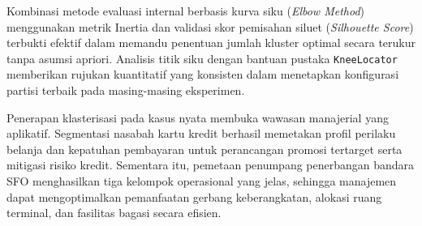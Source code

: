 \documentclass[a4paper,oneside,12pt]{report}
\begin{document}
Kombinasi metode evaluasi internal berbasis kurva siku (\textit{Elbow Method}) menggunakan metrik Inertia dan validasi skor pemisahan siluet (\textit{Silhouette Score}) terbukti efektif dalam memandu penentuan jumlah kluster optimal secara terukur tanpa asumsi apriori. Analisis titik siku dengan bantuan pustaka \texttt{KneeLocator} memberikan rujukan kuantitatif yang konsisten dalam menetapkan konfigurasi partisi terbaik pada masing-masing eksperimen.

Penerapan klasterisasi pada kasus nyata membuka wawasan manajerial yang aplikatif. Segmentasi nasabah kartu kredit berhasil memetakan profil perilaku belanja dan kepatuhan pembayaran untuk perancangan promosi tertarget serta mitigasi risiko kredit. Sementara itu, pemetaan penumpang penerbangan bandara SFO menghasilkan tiga kelompok operasional yang jelas, sehingga manajemen dapat mengoptimalkan pemanfaatan gerbang keberangkatan, alokasi ruang terminal, dan fasilitas bagasi secara efisien.

\cleardoublepage
{}
\end{document}
